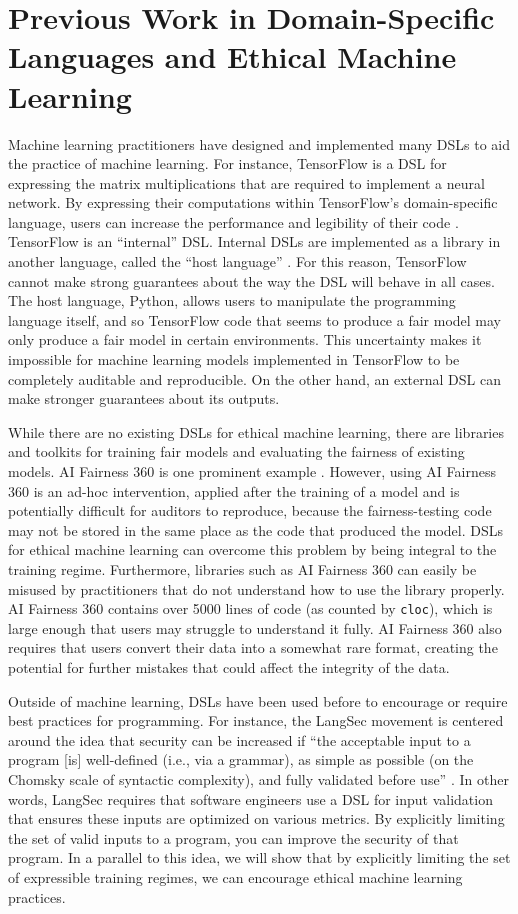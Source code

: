 \documentclass[letterpaper]{article}
\newcommand{\citep}[1]{\cite{#1}}
\begin{document}
\section{Previous Work in Domain-Specific Languages and Ethical Machine Learning}
Machine learning practitioners have designed and implemented many DSLs to aid the practice of machine learning. For instance, TensorFlow is a DSL for expressing the matrix multiplications that are required to implement a neural network. By expressing their computations within TensorFlow’s domain-specific language, users can increase the performance and legibility of their code \citep{Abadi2016}. TensorFlow is an ``internal'' DSL. Internal DSLs are implemented as a library in another language, called the ``host language'' \citep{Fowler2010}. For this reason, TensorFlow cannot make strong guarantees about the way the DSL will behave in all cases. The host language, Python, allows users to manipulate the programming language itself, and so TensorFlow code that seems to produce a fair model may only produce a fair model in certain environments. This uncertainty makes it impossible for machine learning models implemented in TensorFlow to be completely auditable and reproducible. On the other hand, an external DSL can make stronger guarantees about its outputs. 

While there are no existing DSLs for ethical machine learning, there are libraries and toolkits for training fair models and evaluating the fairness of existing models. AI Fairness 360 is one prominent example \citep{Bellamy2018}. However, using AI Fairness 360 is an ad-hoc intervention, applied after the training of a model and is potentially difficult for auditors to reproduce, because the fairness-testing code may not be stored in the same place as the code that produced the model. DSLs for ethical machine learning can overcome this problem by being integral to the training regime. Furthermore, libraries such as AI Fairness 360 can easily be misused by practitioners that do not understand how to use the library properly. AI Fairness 360 contains over 5000 lines of code (as counted by \texttt{cloc}), which is large enough that users may struggle to understand it fully. AI Fairness 360 also requires that users convert their data into a somewhat rare format, creating the potential for further mistakes that could affect the integrity of the data.

Outside of machine learning, DSLs have been used before to encourage or require best practices for programming. For instance, the LangSec movement is centered around the idea that security can be increased if ``the acceptable input to a program [is] well-defined (i.e., via a grammar), as simple as possible (on the Chomsky scale of syntactic complexity), and fully validated before use'' \citep{Momot2016}. In other words, LangSec requires that software engineers use a DSL for input validation that ensures these inputs are optimized on various metrics. By explicitly limiting the set of valid inputs to a program, you can improve the security of that program. In a parallel to this idea, we will show that by explicitly limiting the set of expressible training regimes, we can encourage ethical machine learning practices.
\end{document}
